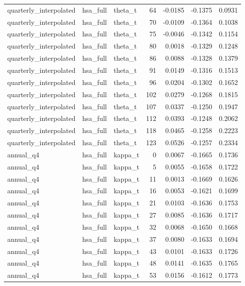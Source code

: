 \begin{tabular}{lllrrrr}
quarterly\_interpolated & hsa\_full & theta\_t & 64 & -0.0185 & -0.1375 & 0.0931 \\
quarterly\_interpolated & hsa\_full & theta\_t & 70 & -0.0109 & -0.1364 & 0.1038 \\
quarterly\_interpolated & hsa\_full & theta\_t & 75 & -0.0046 & -0.1342 & 0.1154 \\
quarterly\_interpolated & hsa\_full & theta\_t & 80 & 0.0018 & -0.1329 & 0.1248 \\
quarterly\_interpolated & hsa\_full & theta\_t & 86 & 0.0088 & -0.1328 & 0.1379 \\
quarterly\_interpolated & hsa\_full & theta\_t & 91 & 0.0149 & -0.1316 & 0.1513 \\
quarterly\_interpolated & hsa\_full & theta\_t & 96 & 0.0204 & -0.1302 & 0.1652 \\
quarterly\_interpolated & hsa\_full & theta\_t & 102 & 0.0279 & -0.1268 & 0.1815 \\
quarterly\_interpolated & hsa\_full & theta\_t & 107 & 0.0337 & -0.1250 & 0.1947 \\
quarterly\_interpolated & hsa\_full & theta\_t & 112 & 0.0393 & -0.1248 & 0.2062 \\
quarterly\_interpolated & hsa\_full & theta\_t & 118 & 0.0465 & -0.1258 & 0.2223 \\
quarterly\_interpolated & hsa\_full & theta\_t & 123 & 0.0526 & -0.1257 & 0.2334 \\
annual\_q4 & hsa\_full & kappa\_t & 0 & 0.0067 & -0.1665 & 0.1736 \\
annual\_q4 & hsa\_full & kappa\_t & 5 & 0.0055 & -0.1658 & 0.1722 \\
annual\_q4 & hsa\_full & kappa\_t & 11 & 0.0013 & -0.1669 & 0.1626 \\
annual\_q4 & hsa\_full & kappa\_t & 16 & 0.0053 & -0.1621 & 0.1699 \\
annual\_q4 & hsa\_full & kappa\_t & 21 & 0.0103 & -0.1636 & 0.1753 \\
annual\_q4 & hsa\_full & kappa\_t & 27 & 0.0085 & -0.1636 & 0.1717 \\
annual\_q4 & hsa\_full & kappa\_t & 32 & 0.0068 & -0.1650 & 0.1668 \\
annual\_q4 & hsa\_full & kappa\_t & 37 & 0.0080 & -0.1633 & 0.1694 \\
annual\_q4 & hsa\_full & kappa\_t & 43 & 0.0101 & -0.1633 & 0.1726 \\
annual\_q4 & hsa\_full & kappa\_t & 48 & 0.0141 & -0.1635 & 0.1765 \\
annual\_q4 & hsa\_full & kappa\_t & 53 & 0.0156 & -0.1612 & 0.1773 \\

\end{tabular}

